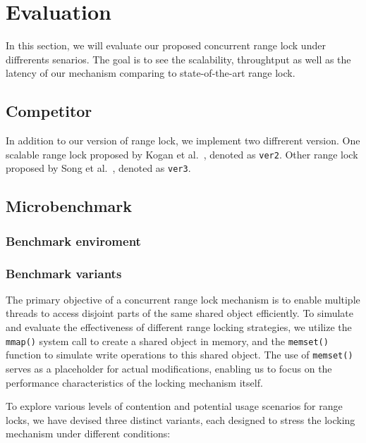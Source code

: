 \chapter{Evaluation}\label{chapter:evaluation}

In this section, we will evaluate our proposed concurrent range lock under diffrerents senarios. The goal is to see the scalability, throughtput as well as the latency of our mechanism comparing to state-of-the-art range lock.

\section{Competitor}

In addition to our version of range lock, we implement two diffrerent version. One scalable range lock proposed by Kogan et al.~\parencite{kogan2020scalable}, denoted as \texttt{ver2}. Other range lock proposed by Song et al.~\parencite{song2013parallelizing}, denoted as \texttt{ver3}.

\section{Microbenchmark}

\subsection{Benchmark enviroment}

\subsection{Benchmark variants}\label{subsec:variant}
The primary objective of a concurrent range lock mechanism is to enable multiple threads to access disjoint parts of the same shared object efficiently. To simulate and evaluate the effectiveness of different range locking strategies, we utilize the \texttt{mmap()} system call to create a shared object in memory, and the \texttt{memset()} function to simulate write operations to this shared object. The use of \texttt{memset()} serves as a placeholder for actual modifications, enabling us to focus on the performance characteristics of the locking mechanism itself.

To explore various levels of contention and potential usage scenarios for range locks, we have devised three distinct variants, each designed to stress the locking mechanism under different conditions:

